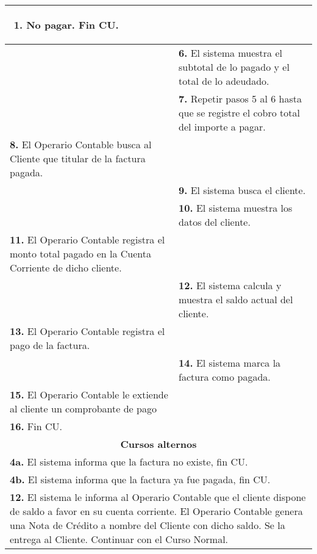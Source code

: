 \documentclass[12pt]{extarticle}
\begin{document}
\begin{longtable}{ |p{8cm}|p{8cm}| }
\begin{enumerate}[label=(\alph*)]
                    \item No pagar. Fin CU.
                \end{enumerate}
            & \\
            \hline
            & \textbf{6. }El sistema muestra el subtotal de lo pagado y el total de lo adeudado.\\
            \hline
            & \textbf{7. }Repetir pasos 5 al 6 hasta que se registre el cobro total del importe a pagar.\\
            \hline
			\textbf{8. }El Operario Contable busca al Cliente que titular de la factura pagada.& \\
            \hline
            & \textbf{9. }El sistema busca el cliente.\\
            \hline
            & \textbf{10. }El sistema muestra los datos del cliente.\\
            \hline
            \textbf{11. }El Operario Contable registra el monto total pagado en la Cuenta Corriente de dicho cliente.&\\
            \hline
            & \textbf{12. }El sistema calcula y muestra el saldo actual del cliente.\\
            \hline
			\textbf{13. }El Operario Contable registra el pago de la factura.& \\
            \hline
            & \textbf{14. }El sistema marca la factura como pagada.\\
            \hline
			\textbf{15. }El Operario Contable le extiende al cliente un comprobante de pago & \\
            \hline
			\textbf{16. }Fin CU. & \\
		\hline
		\multicolumn{2}{|c|}{\textbf{Cursos alternos}}\\
		\hline
		\multicolumn{2}{|p{16cm}|}{\textbf{4a. } El sistema informa que la factura no existe, fin CU.}\\
		\hline	
        \multicolumn{2}{|p{16cm}|}{\textbf{4b. } El sistema informa que la factura ya fue pagada, fin CU.}\\
		\hline	
        \multicolumn{2}{|p{16cm}|}{\textbf{12. } El sistema le informa al Operario Contable que el cliente dispone de saldo a favor en su cuenta corriente. El Operario Contable genera una Nota de Crédito a nombre del Cliente con dicho saldo. Se la entrega al Cliente. Continuar con el Curso Normal.}\\
		\hline	
	\end{longtable}
\end{document}
